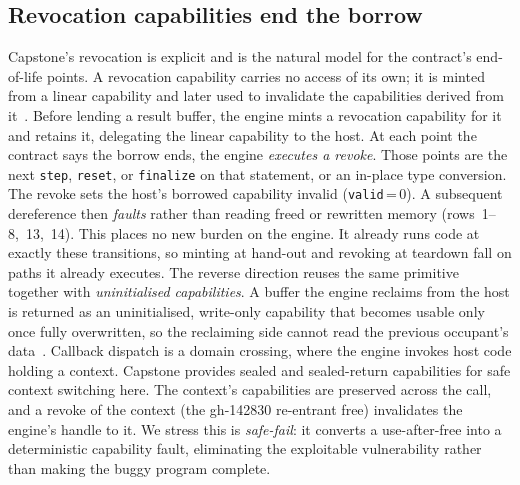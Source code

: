 \documentclass[10pt,twocolumn]{article}
\begin{document}
\subsection{Revocation capabilities end the borrow}
Capstone's revocation is explicit and is the natural model for the contract's
end-of-life points. A revocation capability carries no access of its own; it is
minted from a linear capability and later used to invalidate the capabilities
derived from it~\cite{capstonespec}. Before lending a result buffer, the engine
mints a revocation capability for it and retains it, delegating the linear
capability to the host. At each point the contract says the borrow ends, the
engine \emph{executes a revoke}. Those points are the next \texttt{step},
\texttt{reset}, or \texttt{finalize} on that statement, or an in-place type
conversion. The revoke sets the host's borrowed capability invalid
(\texttt{valid}\,=\,0). A subsequent dereference then \emph{faults} rather than
reading freed or rewritten memory (rows~1--8,~13,~14). This places no new burden
on the engine. It already runs code at exactly these transitions, so minting at
hand-out and revoking at teardown fall on paths it already executes. The reverse
direction reuses the same primitive together with \emph{uninitialised
capabilities}. A buffer the engine reclaims from the host is returned as an
uninitialised, write-only capability that becomes usable only once fully
overwritten, so the reclaiming side cannot read the previous occupant's
data~\cite{capstonespec}. Callback dispatch is a domain crossing, where the
engine invokes host code holding a context. Capstone provides sealed and
sealed-return capabilities for safe context switching here. The context's
capabilities are preserved across the call, and a revoke of the context (the
gh-142830 re-entrant free) invalidates the engine's handle to it. We stress
this is \emph{safe-fail}: it converts a use-after-free into a deterministic
capability fault, eliminating the exploitable vulnerability rather than making
the buggy program complete.
\end{document}
